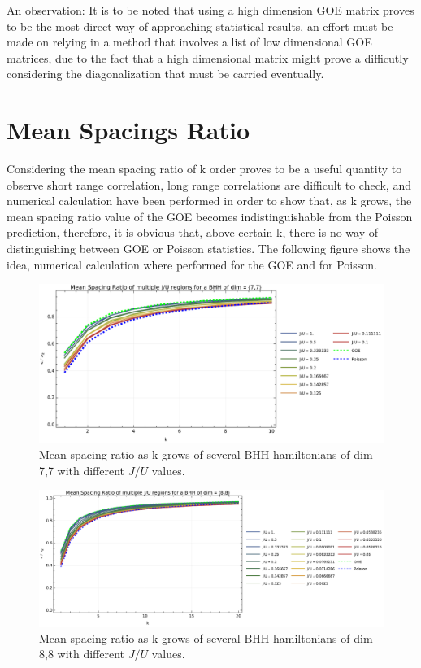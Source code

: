 \documentclass[10pt,a4paper]{article}
\begin{document}
An observation: It is to be noted that using a high dimension GOE matrix proves to be the most direct way of approaching statistical results,
 an effort must be made on relying in a method that involves a list of low dimensional GOE matrices, due to the fact that 
 a high dimensional matrix might prove a difficutly considering the diagonalization that must be carried eventually.

\section{Mean Spacings Ratio}
Considering the mean spacing ratio of k order proves to be a useful quantity to observe short range correlation, long range correlations 
are difficult to check, and numerical calculation have been performed in order to show that, as k grows, the mean spacing ratio 
value of the GOE becomes indistinguishable from the Poisson prediction, therefore, it is obvious that, above certain k, there is 
no way of distinguishing between GOE or Poisson statistics. The following figure shows the idea, numerical calculation where 
performed for the GOE and for Poisson.

\begin{figure}[H]
    \centering
    \includegraphics[width=1\textwidth]{KorderCurves.pdf}
    \caption{Mean spacing ratio as k grows of several BHH hamiltonians of dim 7,7 with different $J/U$ values. }
    \label{fig:KorderCurves}
\end{figure}


\begin{figure}[H]
    \centering
    \includegraphics[width=1.1\textwidth]{KorderCurves88.pdf}
    \caption{Mean spacing ratio as k grows of several BHH hamiltonians of dim 8,8 with different $J/U$ values. }
    \label{fig:KorderCurves88}
\end{figure}
\end{document}
